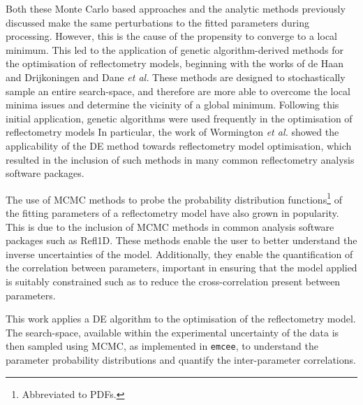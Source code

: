 Both these Monte Carlo based approaches and the analytic methods previously discussed make the same perturbations to the fitted parameters during processing.
However, this is the cause of the propensity to converge to a local minimum.
This led to the application of genetic algorithm-derived methods for the optimisation of reflectometry models, beginning with the works of de Haan and Drijkoningen\autocite{de_haan_genetic_1994} and Dane \emph{et al.}\autocite{dane_application_1998}
These methods are designed to stochastically sample an entire search-space, and therefore are more able to overcome the local minima issues and determine the vicinity of a global minimum.
Following this initial application, genetic algorithms were used frequently in the optimisation of reflectometry models\autocite{ulyanenkov_genetic_2000,ulyanenkov_extended_2005,politsch_unbiased_2002,wormington_characterization_1999}
In particular, the work of Wormington \emph{et al.}\autocite{wormington_characterization_1999} showed the applicability of the DE method towards reflectometry model optimisation, which resulted in the inclusion of such methods in many common reflectometry analysis software packages.\autocite{bjorck_fitting_2011,bjorck_genx_2007,nelson_co-refinement_2006,nelson_refnx_2019,ott_simulreflec_nodate,kienzle_ncnr_nodate}

The use of MCMC methods to probe the probability distribution functions\footnote{Abbreviated to PDFs.} of the fitting parameters of a reflectometry model have also grown in popularity.\autocite{gil_limitations_2012,hoogerheide_structure_2018,owejan_solid_2012,heinrich_myristoylation_2014}
This is due to the inclusion of MCMC methods in common analysis software packages such as Refl1D.\autocite{kienzle_ncnr_nodate}
These methods enable the user to better understand the inverse uncertainties of the model.
Additionally, they enable the quantification of the correlation between parameters, important in ensuring that the model applied is suitably constrained such as to reduce the cross-correlation present between parameters.\autocite{nelson_co-refinement_2006}

This work applies a DE algorithm\autocite{storn_differential_1997,jones_scipy_nodate} to the optimisation of the reflectometry model.
The search-space, available within the experimental uncertainty of the data is then sampled using MCMC, as implemented in \texttt{emcee},\autocite{foreman-mackey_emcee_2013} to understand the parameter probability distributions and quantify the inter-parameter correlations.

